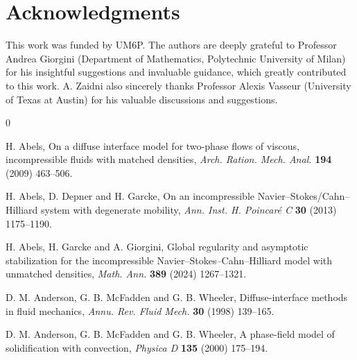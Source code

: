 \documentclass[11pt]{article}
\begin{document}
{\begin{appendices}
\end{appendices}



\section*{Acknowledgments}

This work was funded by UM6P. The authors are deeply grateful to Professor Andrea Giorgini
(Department of Mathematics, Polytechnic University of Milan) for his insightful suggestions and invaluable guidance, which greatly contributed to this work. A. Zaidni also sincerely thanks Professor Alexis Vasseur (University of Texas at Austin) for his valuable discussions and suggestions.

\begin{thebibliography}{0}

H. Abels, On a diffuse interface model for two-phase flows of viscous, incompressible fluids with matched densities, {\it Arch. Ration. Mech. Anal.} {\bf 194} (2009) 463--506.

H. Abels, D. Depner and H. Garcke, On an incompressible Navier--Stokes/Cahn--Hilliard system with degenerate mobility, {\it Ann. Inst. H. Poincar\'e C} {\bf 30} (2013) 1175--1190.

H. Abels, H. Garcke and A. Giorgini, Global regularity and asymptotic stabilization for the incompressible Navier--Stokes--Cahn--Hilliard model with unmatched densities, {\it Math. Ann.} {\bf 389} (2024) 1267--1321.

D. M. Anderson, G. B. McFadden and G. B. Wheeler, Diffuse-interface methods in fluid mechanics, {\it Annu. Rev. Fluid Mech.} {\bf 30} (1998) 139--165.

D. M. Anderson, G. B. McFadden and G. B. Wheeler, A phase-field model of solidification with convection, {\it Physica D} {\bf 135} (2000) 175--194.


\end{thebibliography}}
\end{document}
